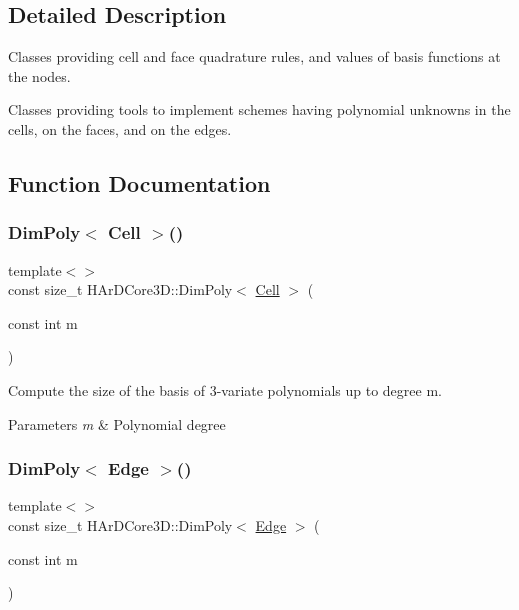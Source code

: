 \subsection{Detailed Description}
Classes providing cell and face quadrature rules, and values of basis functions at the nodes. 

Classes providing tools to implement schemes having polynomial unknowns in the cells, on the faces, and on the edges.

\subsection{Function Documentation}
\mbox{\label{group__HybridCore_gac24ef7d804b2e6401b814a9cb51dc38c}} 
\subsubsection{\texorpdfstring{Dim\+Poly$<$ Cell $>$()}{DimPoly< Cell >()}}
{\footnotesize\ttfamily template$<$$>$ \\
const size\+\_\+t H\+Ar\+D\+Core3\+D\+::\+Dim\+Poly$<$ \hyperlink{classHArDCore3D_1_1Cell}{Cell} $>$ (\begin{DoxyParamCaption}\item[{const int}]{m }\end{DoxyParamCaption})\hspace{0.3cm}{\ttfamily [inline]}}



Compute the size of the basis of 3-\/variate polynomials up to degree m. 


\begin{DoxyParams}{Parameters}
{\em m} & Polynomial degree \\
\hline
\end{DoxyParams}
\mbox{\label{group__HybridCore_gacd3736783277672d9dd3ed154727f3bf}} 
\subsubsection{\texorpdfstring{Dim\+Poly$<$ Edge $>$()}{DimPoly< Edge >()}}
{\footnotesize\ttfamily template$<$$>$ \\
const size\+\_\+t H\+Ar\+D\+Core3\+D\+::\+Dim\+Poly$<$ \hyperlink{classHArDCore3D_1_1Edge}{Edge} $>$ (\begin{DoxyParamCaption}\item[{const int}]{m }\end{DoxyParamCaption})\hspace{0.3cm}{\ttfamily [inline]}}




